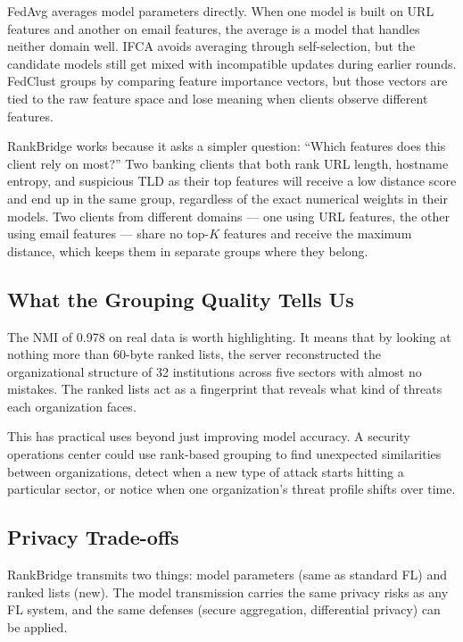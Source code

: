 \documentclass[12pt,a4paper]{article}
\begin{document}
FedAvg averages model parameters directly. When one model is built on URL features and another on email features, the average is a model that handles neither domain well. IFCA avoids averaging through self-selection, but the candidate models still get mixed with incompatible updates during earlier rounds. FedClust groups by comparing feature importance vectors, but those vectors are tied to the raw feature space and lose meaning when clients observe different features.

RankBridge works because it asks a simpler question: ``Which features does this client rely on most?'' Two banking clients that both rank URL length, hostname entropy, and suspicious TLD as their top features will receive a low distance score and end up in the same group, regardless of the exact numerical weights in their models. Two clients from different domains --- one using URL features, the other using email features --- share no top-$K$ features and receive the maximum distance, which keeps them in separate groups where they belong.

\subsection{What the Grouping Quality Tells Us}

The NMI of 0.978 on real data is worth highlighting. It means that by looking at nothing more than 60-byte ranked lists, the server reconstructed the organizational structure of 32 institutions across five sectors with almost no mistakes. The ranked lists act as a fingerprint that reveals what kind of threats each organization faces.

This has practical uses beyond just improving model accuracy. A security operations center could use rank-based grouping to find unexpected similarities between organizations, detect when a new type of attack starts hitting a particular sector, or notice when one organization's threat profile shifts over time.

\subsection{Privacy Trade-offs}

RankBridge transmits two things: model parameters (same as standard FL) and ranked lists (new). The model transmission carries the same privacy risks as any FL system, and the same defenses (secure aggregation, differential privacy) can be applied.
\end{document}
